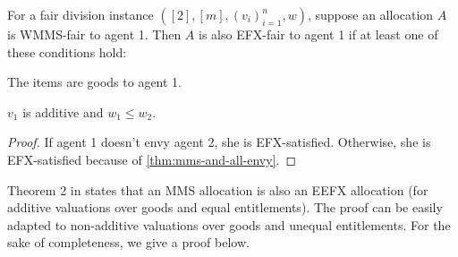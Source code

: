 \begin{lemma}[MMS $\fimplies$ EFX for $n=2$]
\label{thm:impl:mms-to-efx-n2}
For a fair division instance $([2], [m], (v_i)_{i=1}^n, w)$,
suppose an allocation $A$ is WMMS-fair to agent 1.
Then $A$ is also EFX-fair to agent 1 if at least one of these conditions hold:
\begin{tightenum}
\item The items are goods to agent 1.
\item $v_1$ is additive and $w_1 \le w_2$.
\end{tightenum}
\end{lemma}
\begin{proof}
If agent 1 doesn't envy agent 2, she is EFX-satisfied.
Otherwise, she is EFX-satisfied because of \cref{thm:mms-and-all-envy}.
\end{proof}

Theorem 2 in \cite{caragiannis2023new} states that an MMS allocation is also an EEFX allocation
(for additive valuations over goods and equal entitlements).
The proof can be easily adapted to non-additive valuations over goods and unequal entitlements.
For the sake of completeness, we give a proof below.

